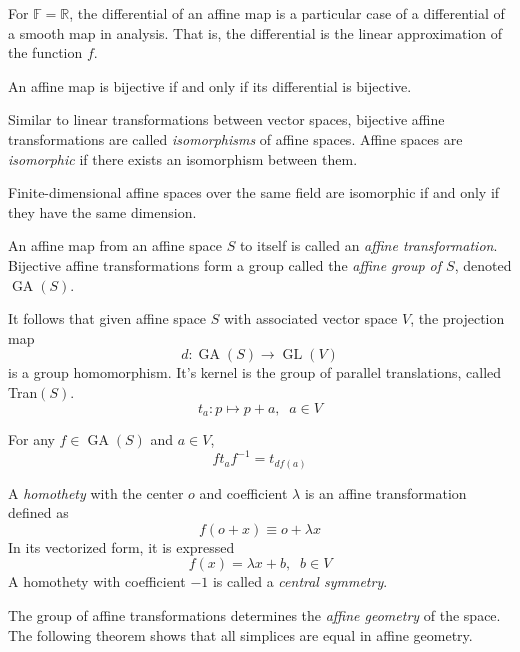\documentclass{article}
\DeclareMathOperator{\GL}{GL}
\DeclareMathOperator{\GA}{GA}
\begin{document}
    For $\mathbb{F} = \mathbb{R}$, the differential of an affine map is a particular case of a differential of a smooth map in analysis. That is, the differential is the linear approximation of the function $f$. 

    \begin{proposition}
    An affine map is bijective if and only if its differential is bijective. 
    \end{proposition}

    \begin{definition}
    Similar to linear transformations between vector spaces, bijective affine transformations are called \textit{isomorphisms} of affine spaces. Affine spaces are \textit{isomorphic} if there exists an isomorphism between them. 
    \end{definition}

    \begin{corollary}
    Finite-dimensional affine spaces over the same field are isomorphic if and only if they have the same dimension. 
    \end{corollary}

    \begin{definition}
    An affine map from an affine space $S$ to itself is called an \textit{affine transformation}. Bijective affine transformations form a group called the \textit{affine group of $S$}, denoted $\GA(S)$. 
    \end{definition}

    It follows that given affine space $S$ with associated vector space $V$, the projection map
    \[d: \GA(S) \longrightarrow \GL(V)\]
    is a group homomorphism. It's kernel is the group of parallel translations, called Tran$(S)$. 
    \[t_a : p \mapsto p + a, \;\; a \in V\]

    \begin{proposition}
    For any $f \in \GA(S)$ and $a \in V$, 
    \[f t_a f^{-1} = t_{df(a)}\]
    \end{proposition}

    \begin{definition}
    A \textit{homothety} with the center $o$ and coefficient $\lambda$ is an affine transformation defined as
    \[f( o + x ) \equiv o + \lambda x\]
    In its vectorized form, it is expressed
    \[f(x) = \lambda x + b, \;\; b \in V\]
    A homothety with coefficient $-1$ is called a \textit{central symmetry}. 
    \end{definition}

    The group of affine transformations determines the \textit{affine geometry} of the space. The following theorem shows that all simplices are equal in affine geometry. 
\end{document}
